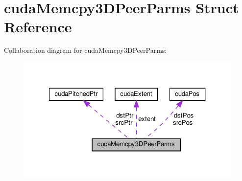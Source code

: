 \hypertarget{structcudaMemcpy3DPeerParms}{}\section{cuda\+Memcpy3\+D\+Peer\+Parms Struct Reference}
\label{structcudaMemcpy3DPeerParms}


Collaboration diagram for cuda\+Memcpy3\+D\+Peer\+Parms\+:\nopagebreak
\begin{figure}[H]
\begin{center}
\leavevmode
\includegraphics[width=321pt]{structcudaMemcpy3DPeerParms__coll__graph}
\end{center}
\end{figure}
